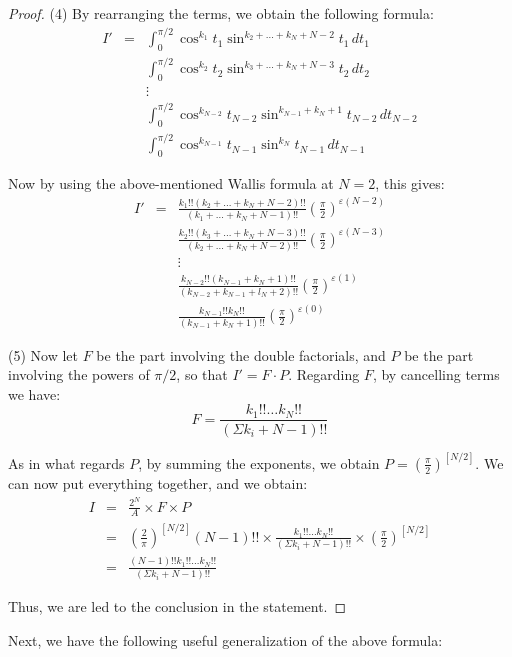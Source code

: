\documentclass[12pt]{amsbook}
\begin{document}
\begin{proof}
(4) By rearranging the terms, we obtain the following formula:
\begin{eqnarray*}
I'
&=&\int_0^{\pi/2}\cos^{k_1}t_1\sin^{k_2+\ldots+k_N+N-2}t_1\,dt_1\\
&&\int_0^{\pi/2}\cos^{k_2}t_2\sin^{k_3+\ldots+k_N+N-3}t_2\,dt_2\\
&&\vdots\\
&&\int_0^{\pi/2}\cos^{k_{N-2}}t_{N-2}\sin^{k_{N-1}+k_N+1}t_{N-2}\,dt_{N-2}\\
&&\int_0^{\pi/2}\cos^{k_{N-1}}t_{N-1}\sin^{k_N}t_{N-1}\,dt_{N-1}
\end{eqnarray*}

Now by using the above-mentioned Wallis formula at $N=2$, this gives:
\begin{eqnarray*}
I'
&=&\frac{k_1!!(k_2+\ldots+k_N+N-2)!!}{(k_1+\ldots+k_N+N-1)!!}\left(\frac{\pi}{2}\right)^{\varepsilon(N-2)}\\
&&\frac{k_2!!(k_3+\ldots+k_N+N-3)!!}{(k_2+\ldots+k_N+N-2)!!}\left(\frac{\pi}{2}\right)^{\varepsilon(N-3)}\\
&&\vdots\\
&&\frac{k_{N-2}!!(k_{N-1}+k_N+1)!!}{(k_{N-2}+k_{N-1}+l_N+2)!!}\left(\frac{\pi}{2}\right)^{\varepsilon(1)}\\
&&\frac{k_{N-1}!!k_N!!}{(k_{N-1}+k_N+1)!!}\left(\frac{\pi}{2}\right)^{\varepsilon(0)}
\end{eqnarray*}

(5) Now let $F$ be the part involving the double factorials, and $P$ be the part involving the powers of $\pi/2$, so that $I'=F\cdot P$. Regarding $F$, by cancelling terms we have:
$$F=\frac{k_1!!\ldots k_N!!}{(\Sigma k_i+N-1)!!}$$

As in what regards $P$, by summing the exponents, we obtain $P=\left(\frac{\pi}{2}\right)^{[N/2]}$. We can now put everything together, and we obtain:
\begin{eqnarray*}
I
&=&\frac{2^N}{A}\times F\times P\\
&=&\left(\frac{2}{\pi}\right)^{[N/2]}(N-1)!!\times\frac{k_1!!\ldots k_N!!}{(\Sigma k_i+N-1)!!}\times\left(\frac{\pi}{2}\right)^{[N/2]}\\
&=&\frac{(N-1)!!k_1!!\ldots k_N!!}{(\Sigma k_i+N-1)!!}
\end{eqnarray*}

Thus, we are led to the conclusion in the statement.
\end{proof}

Next, we have the following useful generalization of the above formula:
\end{document}
